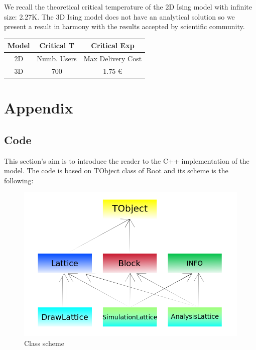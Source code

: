 \documentclass[11pt,a4paper]{article}
\begin{document}
We recall the theoretical critical temperature of the 2D Ising model with infinite size: 2.27K. The 3D Ising model does not have an analytical solution so we present a result in harmony with the results accepted by scientific community.
\begin{center}
  \begin{tabular}{c|c|c}
 	Model & Critical T & Critical Exp  \\
    \hline    
    \hline
    2D & Numb. Users & Max Delivery Cost \\
    \hline
    \hline
    3D & 700         & 1.75 \euro{}     \\
    \hline
  \end{tabular}
\end{center}


 


\newpage

\section{Appendix}
\subsection*{Code}
This section's aim is to introduce the reader to the C++ implementation of the model. The code is based on TObject class of Root and its scheme is the following:

\begin{figure}[h!]
  \centering
  \includegraphics[scale=0.45]{img/Schema_classi.png}
  \caption{Class scheme}
\end{figure}
\newpage
\end{document}
